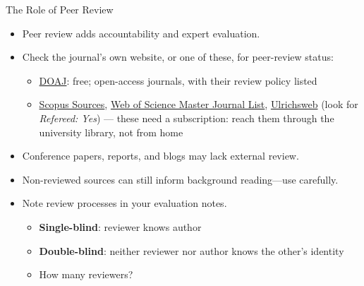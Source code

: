 \documentclass[aspectratio=169]{beamer}
\begin{document}
\begin{frame}{The Role of Peer Review}
\begin{itemize}
  \item Peer review adds accountability and expert evaluation.
  \item Check the journal's own website, or one of these, for peer-review status:
    \begin{itemize}
    \item \href{https://doaj.org/}{DOAJ}: free; open-access journals, with their
      review policy listed
    \item \href{https://www.scopus.com/sources}{Scopus Sources},
      \href{https://mjl.clarivate.com/}{Web of Science Master Journal List},
      \href{https://ulrichsweb.serialssolutions.com}{Ulrichsweb} (look for
      \textit{Refereed: Yes}) --- these need a subscription: reach them
      through the university library, not from home
    \end{itemize}
  \item Conference papers, reports, and blogs may lack external review.
  \item Non-reviewed sources can still inform background reading—use carefully.
  \item Note review processes in your evaluation notes.
    \begin{itemize}
    \item \textbf{Single-blind}: reviewer knows author
    \item \textbf{Double-blind}: neither reviewer nor author knows the other’s identity
    \item How many reviewers?
    \end{itemize}
\end{itemize}
\end{frame}
\end{document}
